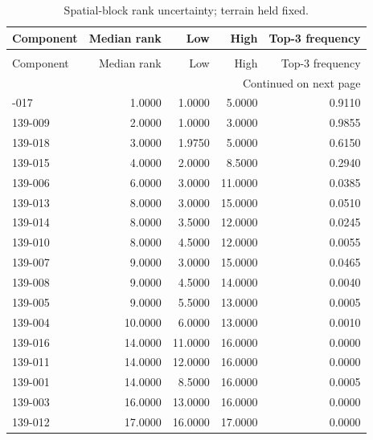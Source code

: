 \documentclass[10pt,a4paper]{article}
\begin{document}
\begin{longtable}{lrrrr}
\caption{Spatial-block rank uncertainty; terrain held fixed.} \\
\toprule
Component & Median rank & Low & High & Top-3 frequency \\
\midrule
\endfirsthead
\caption[]{Spatial-block rank uncertainty; terrain held fixed.} \\
\toprule
Component & Median rank & Low & High & Top-3 frequency \\
\midrule
\endhead
\midrule
\multicolumn{5}{r}{Continued on next page} \\
\midrule
\endfoot
\bottomrule
\endlastfoot
139-017 & 1.0000 & 1.0000 & 5.0000 & 0.9110 \\
139-009 & 2.0000 & 1.0000 & 3.0000 & 0.9855 \\
139-018 & 3.0000 & 1.9750 & 5.0000 & 0.6150 \\
139-015 & 4.0000 & 2.0000 & 8.5000 & 0.2940 \\
139-006 & 6.0000 & 3.0000 & 11.0000 & 0.0385 \\
139-013 & 8.0000 & 3.0000 & 15.0000 & 0.0510 \\
139-014 & 8.0000 & 3.5000 & 12.0000 & 0.0245 \\
139-010 & 8.0000 & 4.5000 & 12.0000 & 0.0055 \\
139-007 & 9.0000 & 3.0000 & 15.0000 & 0.0465 \\
139-008 & 9.0000 & 4.5000 & 14.0000 & 0.0040 \\
139-005 & 9.0000 & 5.5000 & 13.0000 & 0.0005 \\
139-004 & 10.0000 & 6.0000 & 13.0000 & 0.0010 \\
139-016 & 14.0000 & 11.0000 & 16.0000 & 0.0000 \\
139-011 & 14.0000 & 12.0000 & 16.0000 & 0.0000 \\
139-001 & 14.0000 & 8.5000 & 16.0000 & 0.0005 \\
139-003 & 16.0000 & 13.0000 & 16.0000 & 0.0000 \\
139-012 & 17.0000 & 16.0000 & 17.0000 & 0.0000 \\
\end{longtable}
\end{document}
